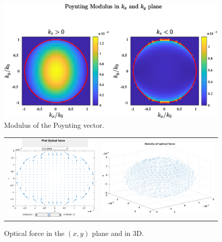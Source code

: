 \begin{figure}[H]
\begin{center}
  \includegraphics*[width=15.0cm,draft=false]{test1poynting2d.eps}
\end{center}
\caption{Modulus of the Poynting vector.}
\end{figure}
\begin{figure}[H]
\begin{center}
\begin{tabular}{cc}
  \includegraphics*[width=7.0cm,draft=false]{test1force2d.eps}
&  \includegraphics*[width=9.0cm,draft=false]{test1force3d.eps}
\end{tabular}

\end{center}
\caption{Optical force in the $(x,y)$ plane and in 3D.}
\end{figure}
